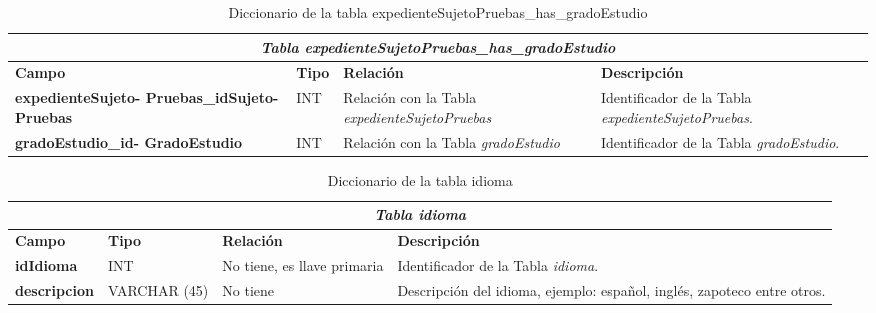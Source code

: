 \begin{table}[H]
\begin{center}
\begin{tabular}{||p{4cm}|p{}|p{}|p{5cm}||}
\hline
\multicolumn{4}{||c||}{\textit{\textbf{Tabla expedienteSujetoPruebas\_has\_gradoEstudio}}}\\
\hline 
\cellcolor{lightgray}\textbf{Campo} & \cellcolor{lightgray}\textbf{Tipo} & \cellcolor{lightgray}\textbf{Relación} & \cellcolor{lightgray}\textbf{Descripción} \\ \hline 
\textbf{expedienteSujeto- Pruebas\_idSujeto- Pruebas} & {INT} & {Relación con la Tabla \textit{expedienteSujetoPruebas}} & {Identificador de la Tabla \textit{expedienteSujetoPruebas}.} \\ \hline
\textbf{gradoEstudio\_id- GradoEstudio} & {INT} & {Relación con la Tabla \textit{gradoEstudio}} & {Identificador de la Tabla \textit{gradoEstudio}.} \\ \hline
\end{tabular}
\caption{Diccionario de la tabla expedienteSujetoPruebas\_has\_gradoEstudio}
\label{Tabla:expedienteSujetoPruebashasgradoEstudio}
\end{center}
\end{table}

\begin{table}[H]
\begin{center}
\begin{tabular}{||p{4cm}|p{}|p{}|p{5cm}||}
\hline
\multicolumn{4}{||c||}{\textit{\textbf{Tabla idioma}}}\\
\hline 
\cellcolor{lightgray}\textbf{Campo} & \cellcolor{lightgray}\textbf{Tipo} & \cellcolor{lightgray}\textbf{Relación} & \cellcolor{lightgray}\textbf{Descripción} \\ \hline 
\textbf{idIdioma} & {INT} & {No tiene, es llave primaria} & {Identificador de la Tabla \textit{idioma}.} \\ \hline
\textbf{descripcion} & {VARCHAR (45)} & {No tiene} & {Descripción del idioma, ejemplo: español, inglés, zapoteco entre otros.} \\ \hline
\end{tabular}
\caption{Diccionario de la tabla idioma}
\label{Tabla:idioma}
\end{center}
\end{table}

